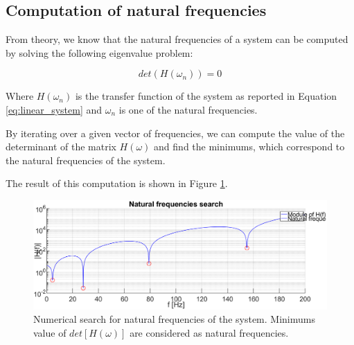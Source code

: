 \subsection{Computation of natural frequencies}
\label{subsec:natural_frequencies}

From theory, we know that the natural frequencies of a system can be computed by solving the following eigenvalue problem:

\begin{equation}
    det(H(\omega_n)) = 0
\end{equation}

Where $H(\omega_n)$ is the transfer function of the system as reported in Equation \ref{eq:linear_system} and $\omega_n$ is one of the natural frequencies.

By iterating over a given vector of frequencies, we can compute the value of the determinant of the matrix $H(\omega)$ and find the minimums, which correspond to the natural frequencies of the system.

The result of this computation is shown in Figure \ref{fig:natural_frequencies}.

\begin{figure}[H]
    \centering
    \includegraphics[width=\textwidth]{img/MATLAB/Part_A/H_module.png}
    \caption{Numerical search for natural frequencies of the system. Minimums value of $det[H(\omega)]$ are considered as natural frequencies.}
    \label{fig:natural_frequencies}
\end{figure}
